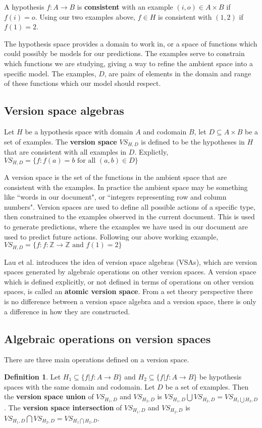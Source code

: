 \documentclass{article}
\theoremstyle{definition}
\newtheorem{definition}{Definition}[section]
\begin{document}
A hypothesis $f: A\rightarrow B$ is \textbf{consistent} with an example $(i,o) \in A\times B$ if $f(i) = o$. Using our two examples above, $f\in H $ is consistent with $(1,2)$ if $f(1) = 2$. 

The hypothesis space provides a domain to work in, or a space of functions which could possibly be models for our predictions. The examples serve to constrain which functions we are studying, giving a way to refine the ambient space into a specific model.  The examples, $D$, are pairs of elements in the domain and range of these functions which our model should respect. 


\subsection{Version space algebras}
Let $H$ be a hypothesis space with domain $A$ and codomain $B$, let $D \subseteq A \times B$ be a set of examples. The \textbf{version space} $VS_{H,D}$ is defined to be the hypotheses in $H$ that are consistent with all examples in $D$. Explictly, $VS_{H,D} = \{f : f(a) = b \text{ for all } (a,b) \in D\}$

A version space is the set of the functions in the ambient space that are consistent with the examples. In practice the ambient space may be something like ``words in our document", or ``integers representing row and column numbers".  Version spaces are used to define all possible actions of a specific type, then constrained to the examples observed in the current document. This is used to generate predictions, where the examples we have used in our document are used to predict future actions.
Following our above working example, $VS_{H,D} = \{f : f: \mathbb{Z} \rightarrow \mathbb{Z} \text{ and } f(1) = 2\}$

Lau et al.\cite{short} introduces the idea of version space algebras (VSAs), which are version spaces generated by algebraic operations on other version spaces. A version space which is defined explicitly, or not defined in terms of operations on other version spaces, is called an \textbf{atomic version space}. From a set theory perspective there is no difference between a version space algebra and a version space, there is only a difference in how they are constructed. 

\subsection{Algebraic operations on version spaces}
There are three main operations defined on a version space. 
\begin{definition}
    Let $H_1 \subseteq \{f | f: A \rightarrow B\}$ and $H_2 \subseteq \{f | f: A \rightarrow B\}$ be hypothesis spaces with the same domain and codomain. Let $D$ be a set of examples. Then the \textbf{version space union} of $VS_{H_1, D}$ and $VS_{H_2, D}$ is $VS_{H_1, D} \bigcup VS_{H_2, D} = VS_{H_1\bigcup H_2, D}$. The \textbf{version space intersection} of $VS_{H_1, D}$ and $VS_{H_2, D}$ is $VS_{H_1, D} \bigcap VS_{H_2, D} = VS_{H_1\bigcap H_2, D}$.
\end{definition}
\end{document}
